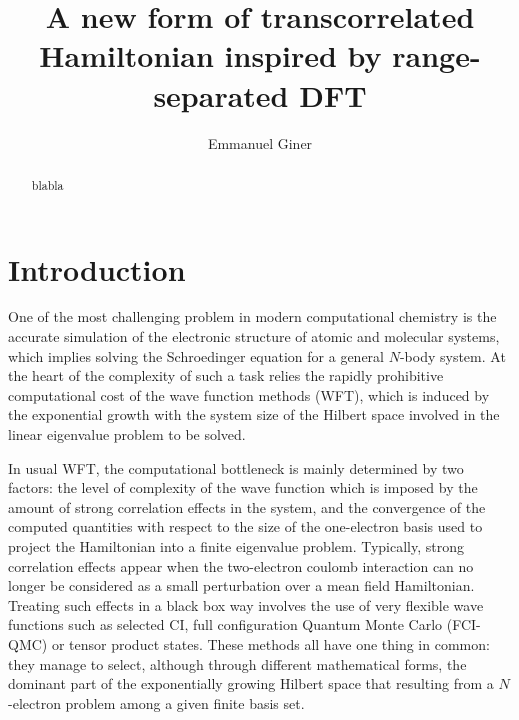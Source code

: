 \documentclass[aip,jcp,reprint,noshowkeys,superscriptaddress]{revtex4-1}
\begin{document}
	

\title{A new form of transcorrelated Hamiltonian inspired by range-separated DFT}

\author{Emmanuel Giner}

\begin{abstract}
blabla

\end{abstract}

\maketitle
\section{Introduction}
One of the most challenging problem in modern computational chemistry is the accurate simulation of the electronic structure of atomic and molecular systems, which implies solving the Schroedinger equation for a general $N$-body system. 
At the heart of the complexity of such a task relies the rapidly prohibitive computational cost of the wave function methods (WFT), which is induced by the exponential growth with the system size of the Hilbert space involved in the linear eigenvalue problem to be solved. 

In usual WFT, the computational bottleneck is mainly determined by two factors: the level of complexity of the wave function which is imposed by the amount of strong correlation effects in the system, and the convergence of the computed quantities with respect to the size of the one-electron basis used to project the Hamiltonian into a finite eigenvalue problem. 
Typically, strong correlation effects appear when the two-electron coulomb interaction can no longer be considered as a small perturbation over a mean field Hamiltonian. Treating such effects in a black box way involves the use of very flexible wave functions such as 
selected CI\cite{HurMalRan-JCP-73,bender,malrieu,buenker1,buenker-book,three_class_CIPSI,harrison,GinSceCaf-CJC-13, GinSceCaf-JCP-15, ShaHolJeaAlaUmr-JCTC-17}, 
full configuration Quantum Monte Carlo\cite{BooThoAla-JCP-09,BooAla-JCP-10,BooCleThoAla-JCP-11,GhaLozAla-JCP-19,VitAlaKat-JCTC-20} (FCI-QMC) or tensor product states\cite{ChaSha-AR-11,BaiRei-JCP-20}. These methods all have one thing in common: they manage to select, although through different mathematical forms, the dominant part of the exponentially growing Hilbert space that resulting from a $N$-electron problem among a given finite basis set. 
\end{document}
